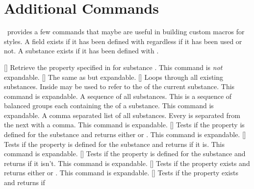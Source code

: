 \documentclass[load-preamble+]{cnltx-doc}
\begin{document}
\section{Additional Commands}
\substances\ provides a few commands that maybe are useful in building custom
macros for styles. A field exists if it has been defined with
 regardless if it has been used or not. A
substance exists if it has been defined with .

\begin{commands}
  []
    Retrieve the property specified in  for substance .
    This command is \emph{not} expandable.
  \expandable{}[]
    The same as  but expandable.
  \expandable{}[]
    Loops through all existing substances. Inside   may
    be used to refer to the  of the current substance. This command
    is expandable.
  \expandable{}
    A sequence of all substances. This is a sequence of balanced groups each
    containing the  of a substance. This command is expandable.
  \expandable{}
    A comma separated list of all substances. Every  is separated
    from the next with a comma. This command is expandable.
  \expandable{}[]
    Tests if the property  is defined for the substance 
    and returns either  or . This command is
    expandable.
  \expandable{}[]
    Tests if the property  is defined for the substance 
    and returns  if it is. This command is expandable.
  \expandable{}[]
    Tests if the property  is defined for the substance 
    and returns  if it isn't. This command is expandable.
  \expandable{}[]
    Tests if the property  exists and returns either
     or . This command is expandable.
  \expandable{}[]
    Tests if the property  exists and returns  if

\end{commands}
\end{document}

